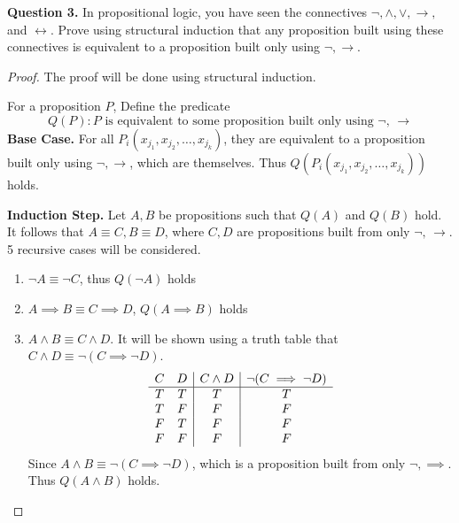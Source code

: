 \documentclass[11pt]{article}
\begin{document}
    \pagebreak
    \noindent\textbf{Question 3.} In propositional logic, you have seen the connectives $\neg, \wedge, \vee, \rightarrow, $ and $\leftrightarrow$. Prove using structural induction that any proposition built using these connectives is equivalent to a proposition built only using $\neg, \rightarrow$.
    \begin{proof}
        The proof will be done using structural induction.

        For a proposition \(P\), Define the predicate
        \[
            Q(P) : P \text{ is equivalent to some proposition built only using } \neg \text{, } \rightarrow
        \]
        \textbf{Base Case.} For all \(P_i(x_{j_1}, x_{j_2}, \dots, x_{j_k})\), they are equivalent to a proposition built only using \(\neg, \rightarrow\), which are themselves. Thus \(Q(P_i(x_{j_1}, x_{j_2}, \dots, x_{j_k}))\) holds.

        \textbf{Induction Step.} Let \(A,B\) be propositions such that \(Q(A)\) and \(Q(B)\) hold. It follows that \(A\equiv C, B\equiv D\), where \(C, D\) are propositions built from only \(\neg \text{, } \rightarrow\). 5 recursive cases will be considered.

        \begin{enumerate}
            \item \(\neg A \equiv \neg C\), thus \(Q(\neg A)\) holds
            \item \(A \implies B \equiv C \implies D\), \(Q(A \implies B)\) holds
            \item \(A \land B \equiv C \land D\). It will be shown using a truth table that \(C \land D \equiv \neg(C\implies \neg D)\).
            \begin{displaymath}
                \begin{array}{c c | c | c}
                    C & D & C \land D & \neg(C\implies \neg D)\\
                    \hline
                    T & T & T & T\\
                    T & F & F & F\\
                    F & T & F & F\\
                    F & F & F & F\\
                \end{array}
            \end{displaymath}
            Since \(A \land B \equiv \neg(C\implies \neg D)\), which is a proposition built from only \(\neg, \implies\). Thus \(Q(A \land B)\) holds.


\end{enumerate}
\end{proof}
\end{document}
